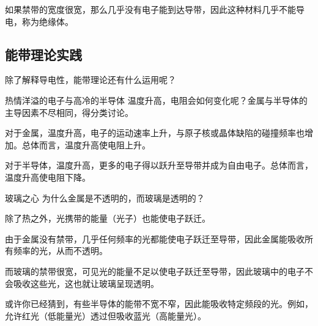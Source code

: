 如果禁带的宽度很宽，那么几乎没有电子能到达导带，因此这种材料几乎不能导电，称为绝缘体。

\subsection{能带理论实践}
除了解释导电性，能带理论还有什么运用呢？

\begin{example}{热情洋溢的电子与高冷的半导体}
温度升高，电阻会如何变化呢？金属与半导体的主导因素不尽相同，得分类讨论。

对于金属，温度升高，电子的运动速率上升，与原子核或晶体缺陷的碰撞频率也增加。总体而言，温度升高使电阻上升。

对于半导体，温度升高，更多的电子得以跃升至导带并成为自由电子。总体而言，温度升高使电阻下降。
\end{example}

\begin{example}{玻璃之心}
为什么金属是不透明的，而玻璃是透明的？

除了热之外，光携带的能量（光子）也能使电子跃迁。

由于金属没有禁带，几乎任何频率的光都能使电子跃迁至导带，因此金属能吸收所有频率的光，从而不透明。

而玻璃的禁带很宽，可见光的能量不足以使电子跃迁至导带，因此玻璃中的电子不会吸收这些光，这也就让玻璃呈现透明。

或许你已经猜到，有些半导体的能带不宽不窄，因此能吸收特定频段的光。例如，允许红光（低能量光）透过但吸收蓝光（高能量光）。
\end{example}

